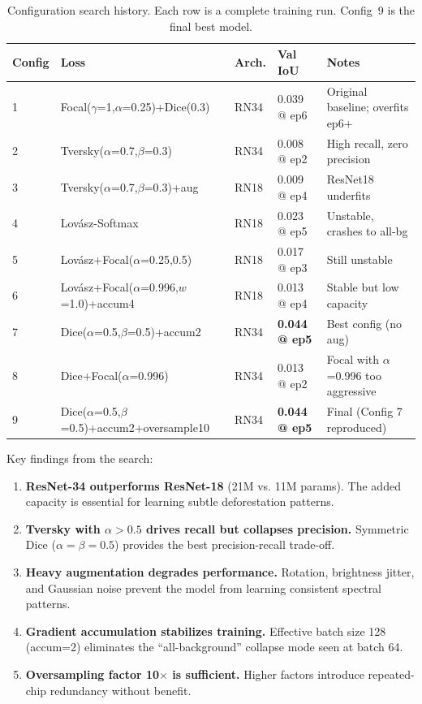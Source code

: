\documentclass[twocolumn]{article}
\begin{document}
\begin{table}[ht]
\centering
\caption{Configuration search history.  Each row is a complete 
training run.  Config~9 is the final best model.}
\label{tab:config_search}
\small
\begin{tabularx}{\columnwidth}{lXXXX}
\toprule
Config & Loss & Arch. & Val IoU & Notes \\
\midrule
1 & Focal($\gamma$=1,$\alpha$=0.25)+Dice(0.3) & RN34 & 0.039 @ ep6 & Original baseline; overfits ep6+ \\
2 & Tversky($\alpha$=0.7,$\beta$=0.3) & RN34 & 0.008 @ ep2 & High recall, zero precision \\
3 & Tversky($\alpha$=0.7,$\beta$=0.3)+aug & RN18 & 0.009 @ ep4 & ResNet18 underfits \\
4 & Lovász-Softmax & RN18 & 0.023 @ ep5 & Unstable, crashes to all-bg \\
5 & Lovász+Focal($\alpha$=0.25,0.5) & RN18 & 0.017 @ ep3 & Still unstable \\
6 & Lovász+Focal($\alpha$=0.996,$w$=1.0)+accum4 & RN18 & 0.013 @ ep4 & Stable but low capacity \\
7 & Dice($\alpha$=0.5,$\beta$=0.5)+accum2 & RN34 & \textbf{0.044 @ ep5} & Best config (no aug) \\
8 & Dice+Focal($\alpha$=0.996) & RN34 & 0.013 @ ep2 & Focal with $\alpha$=0.996 too aggressive \\
9 & Dice($\alpha$=0.5,$\beta$=0.5)+accum2+oversample10 & RN34 & \textbf{0.044 @ ep5} & Final (Config 7 reproduced) \\
\bottomrule
\end{tabularx}
\end{table}

Key findings from the search:
\begin{enumerate}
    \item \textbf{ResNet-34 outperforms ResNet-18} (21M vs. 11M 
          params).  The added capacity is essential for learning 
          subtle deforestation patterns.
    \item \textbf{Tversky with $\alpha > 0.5$ drives recall but 
          collapses precision.}  Symmetric Dice ($\alpha=\beta=0.5$) 
          provides the best precision-recall trade-off.
    \item \textbf{Heavy augmentation degrades performance.}  
          Rotation, brightness jitter, and Gaussian noise prevent 
          the model from learning consistent spectral patterns.
    \item \textbf{Gradient accumulation stabilizes training.}  
          Effective batch size 128 (accum=2) eliminates the 
          ``all-background'' collapse mode seen at batch 64.
    \item \textbf{Oversampling factor 10$\times$ is sufficient.}  
          Higher factors introduce repeated-chip redundancy without 
          benefit.
\end{enumerate}
\end{document}
